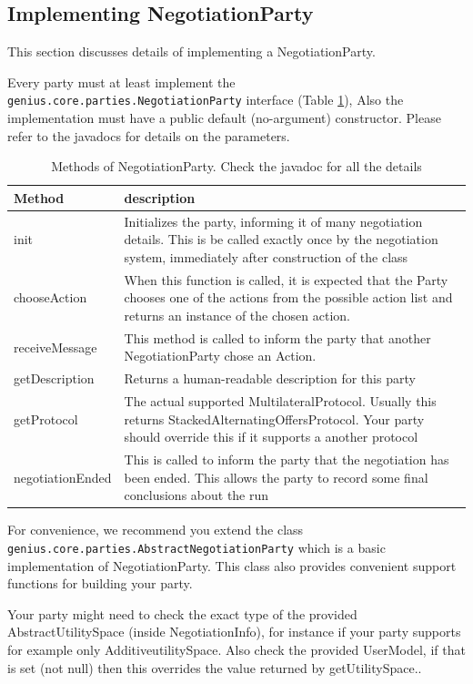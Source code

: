 \documentclass[]{article}
\begin{document}
\subsection{Implementing NegotiationParty}
This section discusses details of implementing a NegotiationParty.  

Every party must at least implement the \texttt{genius.core.parties.NegotiationParty} interface (Table \ref{table:NegotiationPartyInterface}),  Also the implementation must have a public default (no-argument) constructor. Please refer to the javadocs for details on the parameters.

\begin{table}[t]
  \centering
  \begin{tabular}{|p{4cm}|p{7cm}|}
  \hline
  Method & description \\
  \hline\hline
    init &Initializes the party, informing it of many negotiation details. This is be called exactly once by the negotiation system, immediately after construction of the class  \\
    chooseAction & When this function is called, it is expected that the Party chooses one  of the actions from the possible action list and returns an instance of the chosen action. \\
    receiveMessage & This method is called to inform the party that another NegotiationParty chose an Action.\\
    getDescription & Returns a human-readable description for this party \\
    getProtocol & The actual supported MultilateralProtocol. Usually this returns StackedAlternating\-Offers\-Protocol. Your party should override this if it supports a another protocol\\
    negotiationEnded & This is called to inform the party that the negotiation has been ended. This allows the party to record some final conclusions about the run\\
    \hline
  \end{tabular}
  \caption{Methods of NegotiationParty. Check the javadoc for all the details}
  \label{table:NegotiationPartyInterface}
\end{table}


For convenience, we recommend you extend the class \texttt{genius.core.parties.AbstractNegotiationParty} which is a basic implementation of NegotiationParty. This class also provides convenient support functions for building your party.

Your party might need to check the exact type of the provided AbstractUtilitySpace (inside NegotiationInfo), for instance if your party supports for example only AdditiveutilitySpace. Also check the provided UserModel, if that is set (not null) then this overrides the value returned by getUtilitySpace..
\end{document}
